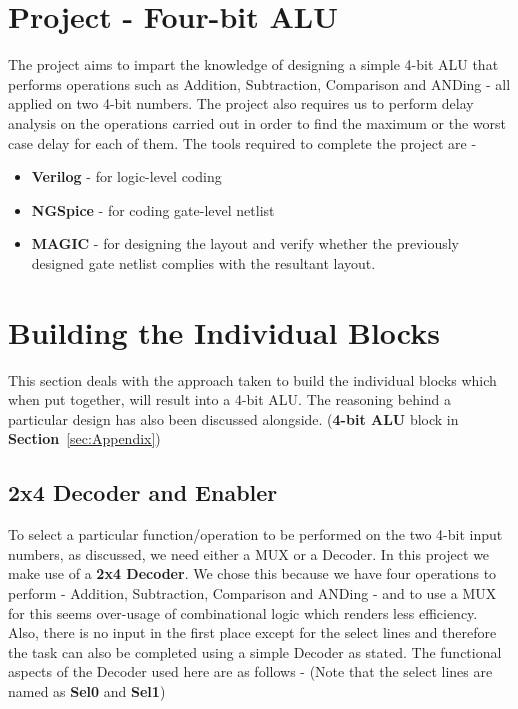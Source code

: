 \documentclass[a4paper, titlepage]{article}
\begin{document}
\section{Project - Four-bit ALU}
The project aims to impart the knowledge of designing a simple 4-bit ALU that performs operations 
such as Addition, Subtraction, Comparison and ANDing - all applied on two 4-bit numbers. The project
also requires us to perform delay analysis on the operations carried out in order to find 
the maximum or the worst case delay for each of them.\newline 
The tools required to complete the project are - 
\begin{itemize}
    \item \textbf{Verilog} - for logic-level coding 
    \item \textbf{NGSpice} - for coding gate-level netlist
    \item \textbf{MAGIC} - for designing the layout and verify whether the previously designed gate
    netlist complies with the resultant layout.
\end{itemize}

\section{Building the Individual Blocks}
This section deals with the approach taken to build the individual blocks which 
when put together, will result into a 4-bit ALU. The reasoning behind a particular design has also been
discussed alongside. (\textbf{4-bit ALU} block in \textbf{Section}~\ref{sec:Appendix})
\subsection{2x4 Decoder and Enabler}
To select a particular function/operation to be performed on the two 4-bit input 
numbers, as discussed, we need either a MUX or a Decoder. \newline
In this project we make use of a \textbf{2x4 Decoder}. We chose this because we have four operations to
perform - Addition, Subtraction, Comparison and ANDing - and to use a MUX for this seems over-usage of 
combinational logic which renders less efficiency. Also, there is no input in the first place except for 
the select lines and therefore the task can also be completed using a simple Decoder as stated. \newline
The functional aspects of the Decoder used here are as follows - 
(Note that the select lines are named as \textbf{Sel0} and \textbf{Sel1})
\end{document}
